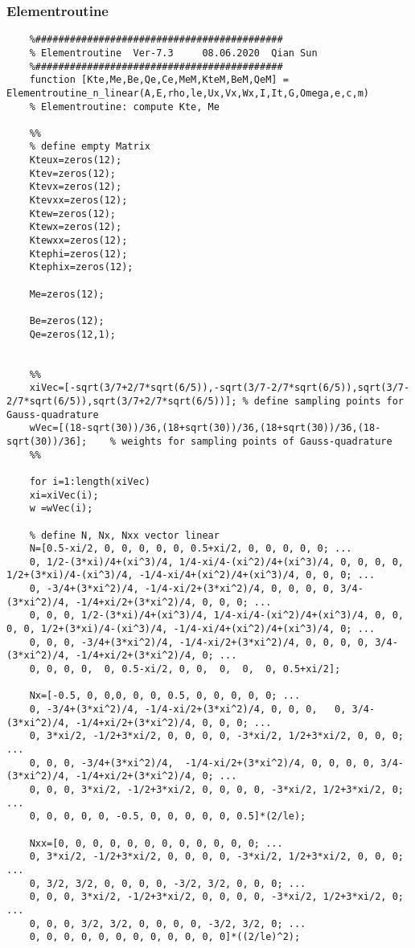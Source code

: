 	\subsubsection*{Elementroutine}
	\begin{lstlisting}
	%###########################################
	% Elementroutine  Ver-7.3     08.06.2020  Qian Sun
	%###########################################
	function [Kte,Me,Be,Qe,Ce,MeM,KteM,BeM,QeM] = Elementroutine_n_linear(A,E,rho,le,Ux,Vx,Wx,I,It,G,Omega,e,c,m)
	% Elementroutine: compute Kte, Me
	
	%%
	% define empty Matrix
	Kteux=zeros(12);
	Ktev=zeros(12);
	Ktevx=zeros(12); 
	Ktevxx=zeros(12);
	Ktew=zeros(12);
	Ktewx=zeros(12); 
	Ktewxx=zeros(12);
	Ktephi=zeros(12);
	Ktephix=zeros(12);
	
	Me=zeros(12);
	
	Be=zeros(12);
	Qe=zeros(12,1);
	
	
	%%
	xiVec=[-sqrt(3/7+2/7*sqrt(6/5)),-sqrt(3/7-2/7*sqrt(6/5)),sqrt(3/7-2/7*sqrt(6/5)),sqrt(3/7+2/7*sqrt(6/5))]; % define sampling points for Gauss-quadrature  
	wVec=[(18-sqrt(30))/36,(18+sqrt(30))/36,(18+sqrt(30))/36,(18-sqrt(30))/36];    % weights for sampling points of Gauss-quadrature 
	%%
	
	for i=1:length(xiVec)
	xi=xiVec(i);
	w =wVec(i);
	
	% define N, Nx, Nxx vector linear 
	N=[0.5-xi/2, 0, 0, 0, 0, 0, 0.5+xi/2, 0, 0, 0, 0, 0; ...
	0, 1/2-(3*xi)/4+(xi^3)/4, 1/4-xi/4-(xi^2)/4+(xi^3)/4, 0, 0, 0, 0, 1/2+(3*xi)/4-(xi^3)/4, -1/4-xi/4+(xi^2)/4+(xi^3)/4, 0, 0, 0; ...
	0, -3/4+(3*xi^2)/4, -1/4-xi/2+(3*xi^2)/4, 0, 0, 0, 0, 3/4-(3*xi^2)/4, -1/4+xi/2+(3*xi^2)/4, 0, 0, 0; ...
	0, 0, 0, 1/2-(3*xi)/4+(xi^3)/4, 1/4-xi/4-(xi^2)/4+(xi^3)/4, 0, 0, 0, 0, 1/2+(3*xi)/4-(xi^3)/4, -1/4-xi/4+(xi^2)/4+(xi^3)/4, 0; ...
	0, 0, 0, -3/4+(3*xi^2)/4, -1/4-xi/2+(3*xi^2)/4, 0, 0, 0, 0, 3/4-(3*xi^2)/4, -1/4+xi/2+(3*xi^2)/4, 0; ...
	0, 0, 0, 0,  0, 0.5-xi/2, 0, 0,  0,  0,  0, 0.5+xi/2];
	
	Nx=[-0.5, 0, 0,0, 0, 0, 0.5, 0, 0, 0, 0, 0; ...
	0, -3/4+(3*xi^2)/4, -1/4-xi/2+(3*xi^2)/4, 0, 0, 0,   0, 3/4-(3*xi^2)/4, -1/4+xi/2+(3*xi^2)/4, 0, 0, 0; ...
	0, 3*xi/2, -1/2+3*xi/2, 0, 0, 0, 0, -3*xi/2, 1/2+3*xi/2, 0, 0, 0; ...
	0, 0, 0, -3/4+(3*xi^2)/4,  -1/4-xi/2+(3*xi^2)/4, 0, 0, 0, 0, 3/4-(3*xi^2)/4, -1/4+xi/2+(3*xi^2)/4, 0; ...
	0, 0, 0, 3*xi/2, -1/2+3*xi/2, 0, 0, 0, 0, -3*xi/2, 1/2+3*xi/2, 0; ...
	0, 0, 0, 0, 0, -0.5, 0, 0, 0, 0, 0, 0.5]*(2/le);
	
	Nxx=[0, 0, 0, 0, 0, 0, 0, 0, 0, 0, 0, 0; ...
	0, 3*xi/2, -1/2+3*xi/2, 0, 0, 0, 0, -3*xi/2, 1/2+3*xi/2, 0, 0, 0; ...
	0, 3/2, 3/2, 0, 0, 0, 0, -3/2, 3/2, 0, 0, 0; ...
	0, 0, 0, 3*xi/2, -1/2+3*xi/2, 0, 0, 0, 0, -3*xi/2, 1/2+3*xi/2, 0; ...
	0, 0, 0, 3/2, 3/2, 0, 0, 0, 0, -3/2, 3/2, 0; ...
	0, 0, 0, 0, 0, 0, 0, 0, 0, 0, 0, 0]*((2/le)^2);
	

\end{lstlisting}
